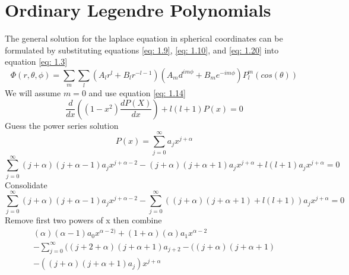 \documentclass[12pt]{article}
\begin{document}
\section{Ordinary Legendre Polynomials} \label{problem2}
    The general solution for the laplace equation in spherical coordinates can be formulated by substituting equations \ref{eq: 1.9}, \ref{eq: 1.10}, and \ref{eq: 1.20} into equation \ref{eq: 1.3}
    \begin{equation} \label{eq: 2.1}
        \Phi(r,\theta, \phi) = \sum_m \sum_l (A_l r^l + B_l r^{-l-1}) (A_m d^{im \phi} + B_m e^{-im \phi}) P_l^m(cos(\theta))
    \end{equation}     
    We will assume $m=0$ and use equation \ref{eq: 1.14}
    \begin{equation} \label{eq: 2.2}
        \frac{d}{dx} \left((1-x^2) \frac{d P(X)}{dx}\right) + l(l+1) P(x) = 0
    \end{equation}
    Guess the power series solution 
    \begin{equation} \label{eq: 2.3}
        P(x) = \sum_{j=0}^{\infty} a_j x^{j+\alpha}
    \end{equation}    
    \begin{equation} \label{eq: 2.4}
        \sum_{j=0}^{\infty} (j+\alpha) (j + \alpha - 1) a_j x^{j+\alpha-2} - (j+\alpha) (j + \alpha + 1) a_j x^{j+\alpha} + l(l+1) a_j x^{j+\alpha} = 0
    \end{equation}        
    Consolidate
    \begin{equation} \label{eq: 2.5}
        \sum_{j=0}^{\infty} (j+\alpha) (j + \alpha - 1) a_j x^{j+\alpha-2} - \sum_{j=0}^{\infty} ((j+\alpha) (j + \alpha + 1) + l(l+1)) a_j x^{j+\alpha} = 0
    \end{equation}            
    Remove first two powers of x then combine
    \begin{equation} \label{eq: 2.6}
        \begin{split}
        (\alpha) (\alpha - 1) a_0 x^{\alpha -2)} + (1 + \alpha) (\alpha) a_1 x^{\alpha - 2} 
        \\ - \sum_{j=0}^{\infty} ((j + 2 + \alpha) (j + \alpha + 1) a_{j + 2} - ((j + \alpha) (j + \alpha + 1) 
        \\- ((j + \alpha) (j + \alpha + 1) a_j) x^{j+ \alpha}
        \end{split}
    \end{equation}            
\end{document}
